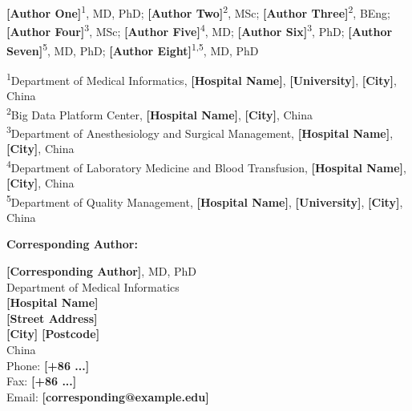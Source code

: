 \documentclass[10pt,twocolumn]{article}
\newcommand{\PH}[1]{{\color{red}\textbf{[#1]}}}
\begin{document}
\thispagestyle{fancy}

\onecolumn


\vspace{3pt}

\vspace{5pt}
\noindent
\PH{Author One}\textsuperscript{1}, MD, PhD;
\PH{Author Two}\textsuperscript{2}, MSc;
\PH{Author Three}\textsuperscript{2}, BEng;
\PH{Author Four}\textsuperscript{3}, MSc;
\PH{Author Five}\textsuperscript{4}, MD;
\PH{Author Six}\textsuperscript{3}, PhD;
\PH{Author Seven}\textsuperscript{5}, MD, PhD;
\PH{Author Eight}\textsuperscript{1,5}, MD, PhD

\vspace{2pt}
{\footnotesize
\noindent\textsuperscript{1}Department of Medical Informatics, \PH{Hospital Name}, \PH{University}, \PH{City}, China\\
\noindent\textsuperscript{2}Big Data Platform Center, \PH{Hospital Name}, \PH{City}, China\\
\noindent\textsuperscript{3}Department of Anesthesiology and Surgical Management, \PH{Hospital Name}, \PH{City}, China\\
\noindent\textsuperscript{4}Department of Laboratory Medicine and Blood Transfusion, \PH{Hospital Name}, \PH{City}, China\\
\noindent\textsuperscript{5}Department of Quality Management, \PH{Hospital Name}, \PH{University}, \PH{City}, China\par}

\vspace{4pt}
\noindent\textbf{Corresponding Author:}\\
{\footnotesize
\PH{Corresponding Author}, MD, PhD\\
Department of Medical Informatics\\
\PH{Hospital Name}\\
\PH{Street Address}\\
\PH{City} \PH{Postcode}\\
China\\
Phone: \PH{+86 ...}\\
Fax: \PH{+86 ...}\\
Email: \PH{corresponding@example.edu}\par}
\end{document}
